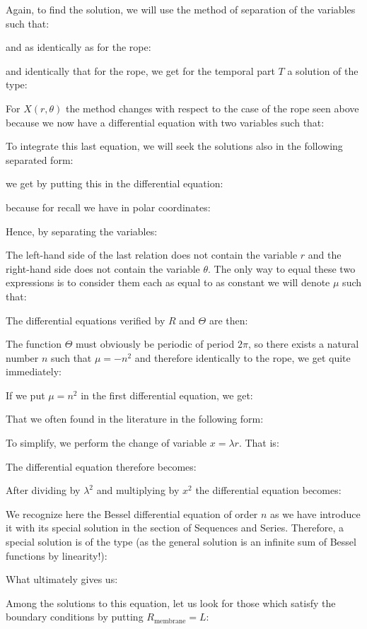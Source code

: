 	Again, to find the solution, we will use the method of separation of the variables such that:
	
	and as identically as for the rope:
	
	and identically that for the rope, we get for the temporal part $T$ a solution of the type:
	
	For $X(r,\theta)$ the method changes with respect to the case of the rope seen above because we now have a differential equation with two variables such that:
	
	To integrate this last equation, we will seek the solutions also in the following separated form:
	
	we get by putting this in the differential equation:
	
	because for recall we have in polar coordinates:
	
	Hence, by separating the variables:
	
	The left-hand side of the last relation does not contain the variable $r$ and the right-hand side does not contain the variable $\theta$. The only way to equal these two expressions is to consider them each as equal to as constant we will denote $\mu$ such that:
	
	The differential equations verified by $R$ and $\Theta$ are then:
	
	The function $\Theta$ must obviously be periodic of period $2\pi$, so there exists a natural number $n$ such that $\mu=-n^2$ and therefore identically to the rope, we get quite immediately:
	
	If we put $\mu=n^2$ in the first differential equation, we get:
	
	That we often found in the literature in the following form:
	
	To simplify, we perform the change of variable $x=\lambda r$. That is:
	
	The differential equation therefore becomes:
	
	After dividing by $\lambda^2$ and multiplying by $x^2$ the differential equation becomes:
	
	We recognize here the Bessel differential equation of order $n$ as we have introduce it with its special solution in the section of Sequences and Series. Therefore, a special solution is of the type (as the general solution is an infinite sum of Bessel functions by linearity!):
	
	What ultimately gives us:
	
	Among the solutions to this equation, let us look for those which satisfy the boundary conditions by putting $R_\text{membrane}=L$:
	
